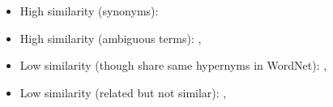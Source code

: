 \begin{itemize}
\item High similarity (synonyms): 
\item High similarity (ambiguous terms): ,

\item Low similarity (though share same hypernyms in WordNet):
, 

\item Low similarity (related but not similar): , 
%
\end{itemize}


